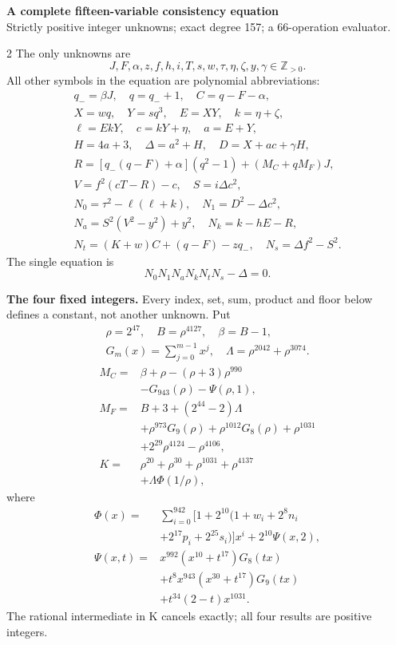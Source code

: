 \documentclass[10pt]{article}
\begin{document}
\begin{center}
{\large\bfseries A complete fifteen-variable consistency equation}\\[-1pt]
{\small Strictly positive integer unknowns; exact degree 157; a 66-operation evaluator.}
\end{center}\vspace{-8pt}
\begin{multicols}{2}
\fontsize{9}{9.5}\selectfont
The only unknowns are
\[
J,F,\alpha,z,f,h,i,T,s,w,\tau,\eta,\zeta,y,\gamma\in\mathbb Z_{>0}.
\]
All other symbols in the equation are polynomial abbreviations:
\[
\begin{gathered}
q_-=\beta J,\quad q=q_-+1,\quad C=q-F-\alpha,\\
X=wq,\quad Y=sq^3,\quad E=XY,\quad k=\eta+\zeta,\\
\ell=EkY,\quad c=kY+\eta,\quad a=E+Y,\\
H=4a+3,\quad\Delta=a^2+H,\quad D=X+ac+\gamma H,\\
R=[q_-(q-F)+\alpha](q^2-1)+(M_C+qM_F)J,\\
V=f^2(cT-R)-c,\quad S=i\Delta c^2,\\
N_0=\tau^2-\ell(\ell+k),\quad N_1=D^2-\Delta c^2,\\
N_a=S^2(V^2-y^2)+y^2,\quad N_k=k-hE-R,\\
N_t=(K+w)C+(q-F)-zq_-,\quad N_s=\Delta f^2-S^2.
\end{gathered}
\]
The single equation is
\[
\boxed{N_0N_1N_aN_kN_tN_s-\Delta=0.}
\]

\textbf{The four fixed integers.}
Every index, set, sum, product and floor below defines a constant, not
another unknown. Put
\[
\begin{gathered}
\rho=2^{47},\quad B=\rho^{4127},\quad\beta=B-1,\\
G_m(x)=\sum_{j=0}^{m-1}x^j,\quad
\Lambda=\rho^{2042}+\rho^{3074}.
\end{gathered}
\]
\begin{align*}
M_C={}&\beta+\rho-(\rho+3)\rho^{990}\\
&-G_{943}(\rho)-\Psi(\rho,1),\\
M_F={}&B+3+(2^{44}-2)\Lambda\\
&+\rho^{973}G_9(\rho)+\rho^{1012}G_8(\rho)
  +\rho^{1031}\\
&+2^{29}\rho^{4124}-\rho^{4106},\\
K={}&\rho^{20}+\rho^{30}+\rho^{1031}+\rho^{4137}\\
&+\Lambda\Phi(1/\rho),
\end{align*}
where
\[
\begin{split}
\Phi(x)={}&\sum_{i=0}^{942}[1+2^{10}(1+w_i+2^8n_i\\
&+2^{17}p_i+2^{25}s_i)]x^i+2^{10}\Psi(x,2),\\
\Psi(x,t)={}&x^{992}(x^{10}+t^{17})G_8(tx)\\
&+t^8x^{943}(x^{30}+t^{17})G_9(tx)\\
&+t^{34}(2-t)x^{1031}.
\end{split}
\]
The rational intermediate in K cancels exactly; all four results are positive integers.


\end{multicols}
\end{document}
